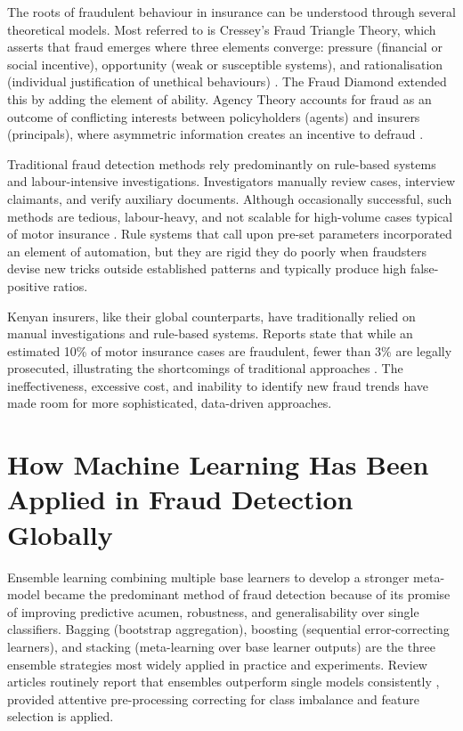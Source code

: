 \documentclass[12pt,a4paper,oneside]{report}
\numberwithin{equation}{chapter}
\begin{document}
The roots of fraudulent behaviour in insurance can be understood through several theoretical
models. Most referred to is Cressey's Fraud Triangle Theory, which asserts that fraud emerges
where three elements converge: pressure (financial or social incentive), opportunity (weak or
susceptible systems), and rationalisation (individual justification of unethical behaviours)
\cite{bsc2025ensemble}. The Fraud Diamond extended this by adding the element of ability. Agency
Theory accounts for fraud as an outcome of conflicting interests between policyholders (agents)
and insurers (principals), \cite{njeru2022detection} where asymmetric information creates an incentive to defraud
.

Traditional fraud detection methods rely predominantly on rule-based systems and labour-intensive
investigations. Investigators manually review cases, interview claimants, and verify auxiliary
documents. Although occasionally successful, such methods are tedious, labour-heavy, and not
scalable for high-volume cases typical of motor insurance \cite{schrijver2024automobile}. Rule
systems that call upon pre-set parameters incorporated an element of automation, but they are
rigid they do poorly when fraudsters devise new tricks outside established patterns
\cite{schrijver2024automobile} and typically produce high false-positive ratios.

Kenyan insurers, like their global counterparts, have traditionally relied on manual
investigations and rule-based systems. Reports state that while an estimated 10\% of motor
insurance cases are fraudulent, fewer than 3\% are legally prosecuted, illustrating the
shortcomings of traditional approaches \cite{mainafraud}. The ineffectiveness, excessive cost,
and inability to identify new fraud trends have made room for more sophisticated, data-driven
approaches.

\section{How Machine Learning Has Been Applied in Fraud Detection Globally}

Ensemble learning combining multiple base learners to develop a stronger meta-model became
the predominant method of fraud detection because of its promise of improving predictive acumen,
robustness, and generalisability over single classifiers. Bagging (bootstrap aggregation),
boosting (sequential error-correcting learners), and stacking (meta-learning over base learner
outputs) are the three ensemble strategies most widely applied in practice and experiments. Review
articles routinely report that ensembles outperform single models consistently
\cite{Ming2024,Khalid2024,Eteng2025,Scrivano2024}, provided attentive pre-processing correcting
for class imbalance and feature selection is applied.
\end{document}
